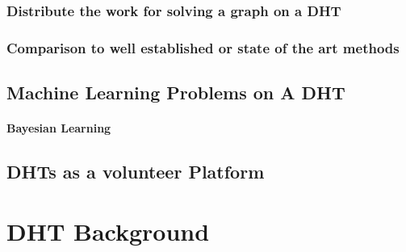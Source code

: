 \documentclass[10pt,letterpaper]{report}
\begin{document}
\subsection{Distribute the work for solving a graph on a DHT}
\subsection{Comparison to well established or state of the art methods}

\section{Machine Learning Problems on A DHT}
\subsubsection{Bayesian Learning}

\section{DHTs as a volunteer Platform}

\chapter{DHT Background}





\end{document}

